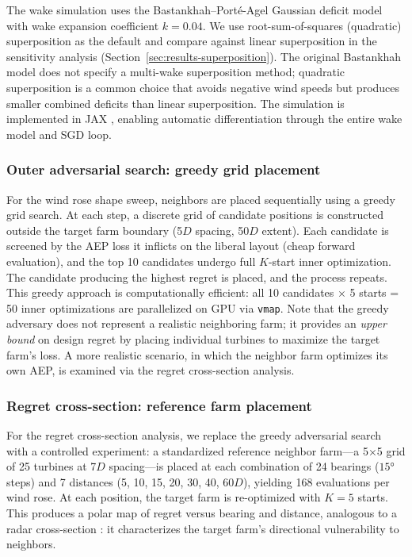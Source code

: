 \documentclass[manuscript, 12pt]{copernicus}
\begin{document}
The wake simulation uses the Bastankhah--Port\'e-Agel Gaussian deficit model \citep{Bastankhah2014} with wake expansion coefficient $k = 0.04$.
We use root-sum-of-squares (quadratic) superposition as the default and compare against linear superposition in the sensitivity analysis (Section~\ref{sec:results-superposition}).
The original Bastankhah model does not specify a multi-wake superposition method; quadratic superposition is a common choice that avoids negative wind speeds but produces smaller combined deficits than linear superposition.
The simulation is implemented in JAX \citep{jax2018github}, enabling automatic differentiation through the entire wake model and SGD loop.

\subsubsection{Outer adversarial search: greedy grid placement}\label{sec:greedy}

For the wind rose shape sweep, neighbors are placed sequentially using a greedy grid search.
At each step, a discrete grid of candidate positions is constructed outside the target farm boundary (5$D$ spacing, 50$D$ extent).
Each candidate is screened by the AEP loss it inflicts on the liberal layout (cheap forward evaluation), and the top 10 candidates undergo full $K$-start inner optimization.
The candidate producing the highest regret is placed, and the process repeats.
This greedy approach is computationally efficient: all 10 candidates $\times$ 5 starts = 50 inner optimizations are parallelized on GPU via \texttt{vmap}.
Note that the greedy adversary does not represent a realistic neighboring farm; it provides an \emph{upper bound} on design regret by placing individual turbines to maximize the target farm's loss.
A more realistic scenario, in which the neighbor farm optimizes its own AEP, is examined via the regret cross-section analysis.

\subsubsection{Regret cross-section: reference farm placement}\label{sec:cross-section}

For the regret cross-section analysis, we replace the greedy adversarial search with a controlled experiment: a standardized reference neighbor farm---a 5$\times$5 grid of 25 turbines at 7$D$ spacing---is placed at each combination of 24 bearings ($15°$ steps) and 7 distances (5, 10, 15, 20, 30, 40, 60$D$), yielding 168 evaluations per wind rose.
At each position, the target farm is re-optimized with $K = 5$ starts.
This produces a polar map of regret versus bearing and distance, analogous to a radar cross-section \citep{rcs_analogy}: it characterizes the target farm's directional vulnerability to neighbors.
\end{document}
